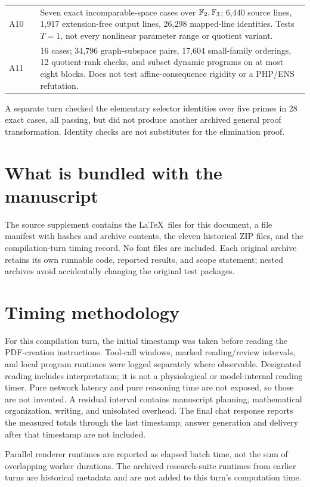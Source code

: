 \begin{longtable}{@{}L{0.08\textwidth}L{0.35\textwidth}L{0.49\textwidth}@{}}
A10 &  & Seven exact incomparable-space cases over $\mathbb F_2,\mathbb F_3$; 6,440 source lines, 1,917 extension-free output lines, 26,298 mapped-line identities. Tests $T=1$, not every nonlinear parameter range or quotient variant.\\
A11 &  & 16 cases; 34,796 graph-subspace pairs, 17,604 small-family orderings, 12 quotient-rank checks, and subset dynamic programs on at most eight blocks. Does not test affine-consequence rigidity or a PHP/ENS refutation.\\\bottomrule
\end{longtable}

A separate turn checked the elementary selector identities over five primes in 28 exact cases, all passing, but did not produce another archived general proof transformation. Identity checks are not substitutes for the elimination proof.

\section{What is bundled with the manuscript}
The source supplement contains the \LaTeX\ files for this document, a file manifest with hashes and archive contents, the eleven historical ZIP files, and the compilation-turn timing record. No font files are included. Each original archive retains its own runnable code, reported results, and scope statement; nested archives avoid accidentally changing the original test packages.

\section{Timing methodology}
For this compilation turn, the initial timestamp was taken before reading the PDF-creation instructions. Tool-call windows, marked reading/review intervals, and local program runtimes were logged separately where observable. Designated reading includes interpretation; it is not a physiological or model-internal reading timer. Pure network latency and pure reasoning time are not exposed, so those are not invented. A residual interval contains manuscript planning, mathematical organization, writing, and unisolated overhead. The final chat response reports the measured totals through the last timestamp; answer generation and delivery after that timestamp are not included.

Parallel renderer runtimes are reported as elapsed batch time, not the sum of overlapping worker durations. The archived research-suite runtimes from earlier turns are historical metadata and are not added to this turn's computation time.


